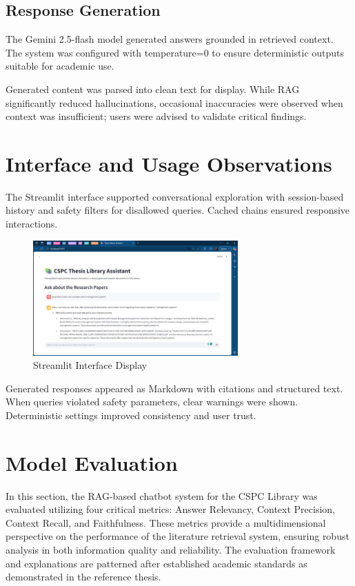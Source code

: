\begin{refsection}
\subsection{Response Generation}

The Gemini 2.5-flash model generated answers grounded in retrieved context. The system was configured with temperature=0 to ensure deterministic outputs suitable for academic use.
 
Generated content was parsed into clean text for display. While RAG significantly reduced hallucinations, occasional inaccuracies were observed when context was insufficient; users were advised to validate critical findings.

\section{Interface and Usage Observations}

The Streamlit interface supported conversational exploration with session-based history and safety filters for disallowed queries. Cached chains ensured responsive interactions.

\begin{figure}[h]
    \centering
    \includegraphics[width=0.7\textwidth]{figures/streamlit.png}
    \caption{Streamlit Interface Display}
\end{figure}

Generated responses appeared as Markdown with citations and structured text. When queries violated safety parameters, clear warnings were shown. Deterministic settings improved consistency and user trust.

\section{Model Evaluation}
In this section, the RAG-based chatbot system for the CSPC Library was evaluated utilizing four critical metrics: Answer Relevancy, Context Precision, Context Recall, and Faithfulness. These metrics provide a multidimensional perspective on the performance of the literature retrieval system, ensuring robust analysis in both information quality and reliability. The evaluation framework and explanations are patterned after established academic standards as demonstrated in the reference thesis.


\end{refsection}
